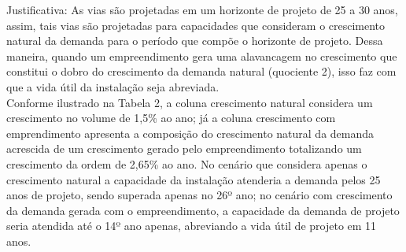 \documentclass[]{article}
\begin{document}
Justificativa: As vias são projetadas em um horizonte de projeto de 25 a
30 anos, assim, tais vias são projetadas para capacidades que consideram
o crescimento natural da demanda para o período que compõe o horizonte
de projeto. Dessa maneira, quando um empreendimento gera uma alavancagem
no crescimento que constitui o dobro do crescimento da demanda natural
(quociente 2), isso faz com que a vida útil da instalação seja
abreviada.\\
 Conforme ilustrado na Tabela 2, a coluna crescimento natural considera
um crescimento no volume de 1,5\% ao ano; já a coluna crescimento com
emprendimento apresenta a composição do crescimento natural da demanda
acrescida de um crescimento gerado pelo empreendimento totalizando um
crescimento da ordem de 2,65\% ao ano. No cenário que considera apenas o
crescimento natural a capacidade da instalação atenderia a demanda pelos
25 anos de projeto, sendo superada apenas no 26º ano; no cenário com
crescimento da demanda gerada com o empreendimento, a capacidade da
demanda de projeto seria atendida até o 14º ano apenas, abreviando a
vida útil de projeto em 11 anos.
\end{document}
